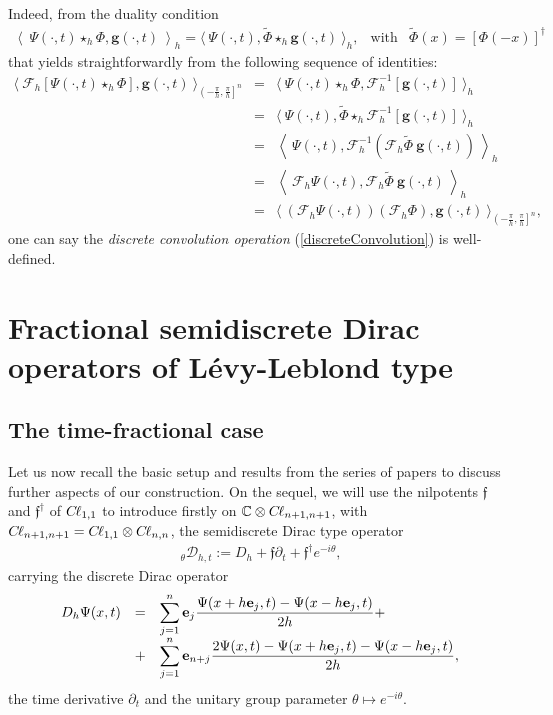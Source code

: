 \documentclass{elsarticle}
\newcommand{\BC}{{\mathbb C}}
\newcommand{\Qh}{\left(-\frac{\pi}{h},\frac{\pi}{h}\right]^n}
\newcommand{\g}{\textbf{g}}
\newcommand{\e}{{\bf e}}
\newcommand{\f}{{\mathfrak f}}
\newcommand{\cl}{C \kern -0.1em \ell}
\begin{document}
Indeed, from the duality condition
\begin{eqnarray*}
	\left\langle~ \varPsi(\cdot,t) \star_{h} \Phi,\g(\cdot,t)~\right\rangle_{h}=\langle~ \varPsi(\cdot,t),\widetilde{\Phi} \star_{h} \g(\cdot,t)~\rangle_{h}, & \mbox{with}& \widetilde{\Phi}(x)=[\Phi(-x)]^\dagger
\end{eqnarray*}
that yields straightforwardly from the following sequence of identities:
\begin{eqnarray*}
	\langle~\mathcal{F}_{h}\left[\varPsi(\cdot,t)\star_{h} \Phi\right],\g(\cdot,t) ~\rangle_{\Qh}&=&
	\langle~\varPsi(\cdot,t)\star_{h} \Phi, \mathcal{F}_{h}^{-1}[\g(\cdot,t)]~ \rangle_{h}
	\\
	&=&\langle~\varPsi(\cdot,t), \widetilde{\Phi}\star_{h}\mathcal{F}_{h}^{-1}[\g(\cdot,t)]~ \rangle_{h} \\
	&=&\left\langle~\varPsi(\cdot,t),\mathcal{F}_{h}^{-1}\left( \mathcal{F}_{h}\widetilde{\Phi}~\g(\cdot,t)\right)~ \right\rangle_{h} \\
	&=&\left\langle~\mathcal{F}_{h}\varPsi(\cdot,t), \mathcal{F}_{h}\widetilde{\Phi}~\g(\cdot,t)~ \right\rangle_{h} \\
	&=&\langle~\left(\mathcal{F}_{h}\varPsi(\cdot,t)\right)\left(\mathcal{F}_{h}\Phi\right),\g(\cdot,t) ~\rangle_{\Qh},
\end{eqnarray*}
one can say the \textit{discrete convolution operation} (\ref{discreteConvolution}) is well-defined.

\section{Fractional semidiscrete Dirac operators of L\'evy-Leblond type}\label{SemidiscreteSection}
\subsection{The time-fractional case}\label{TimeFractionalSection}

Let us now recall the basic setup and results from the series of papers \cite{FaustinoKGordonDirac16,FaustinoMMAS17,F19,F19b} to discuss further aspects of our
construction. On the sequel, we will use the nilpotents $\f$ and $\f^\dagger$ of $\cl_{1,1}$
to introduce firstly on $\BC\otimes\cl_{n+1,n+1}$, with $\cl_{n+1,n+1}=\cl_{1,1}\otimes \cl_{n,n}$, the semidiscrete Dirac type operator 
\begin{eqnarray}
	\label{SemidiscreteDh}
	{~}_\theta\mathcal{D}_{h,t}:=D_h+\f \partial_t +\f^\dagger e^{-i\theta},
\end{eqnarray}
carrying the discrete Dirac operator
\begin{eqnarray}
	\label{DiracEqh}
	\begin{array}{lll}
		D_h \Psi(x,t)&=&\displaystyle \sum_{j=1}^n\e_j\frac{\Psi(x+h \e_j,t)-\Psi(x-h\e_j,t)}{2h}+ \\
		&+&	\displaystyle \sum_{j=1}^n\e_{n+j}\frac{2\Psi(x,t)-\Psi(x+h \e_j,t)-\Psi(x-h \e_j,t)}{2h},
	\end{array}
\end{eqnarray}
the time derivative $\partial_t$ and the unitary group parameter $\theta \mapsto e^{-i\theta}$.
\end{document}
